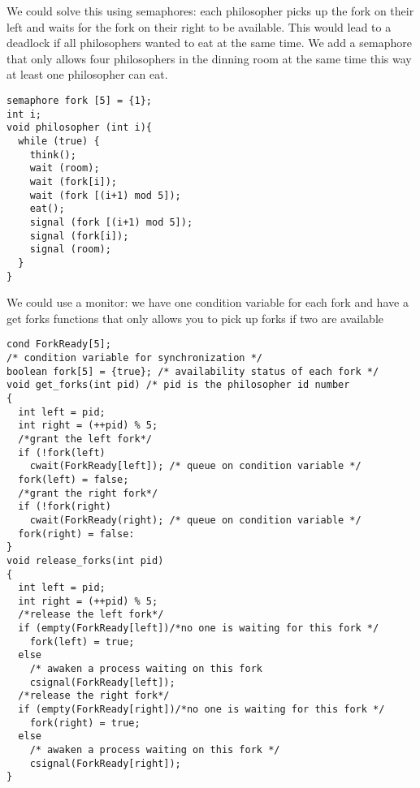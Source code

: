 \documentclass[12pt]{article}
\begin{document}
We could solve this using semaphores: each philosopher picks up the fork on their left and waits for the fork on their right to be available. This would lead to a deadlock if all philosophers wanted to eat at the same time. We add a semaphore that only allows four philosophers in the dinning room at the same time this way at least one philosopher can eat.

\begin{lstlisting}
semaphore fork [5] = {1};
int i;
void philosopher (int i){
  while (true) {
    think();
    wait (room);
    wait (fork[i]);
    wait (fork [(i+1) mod 5]);
    eat();
    signal (fork [(i+1) mod 5]);
    signal (fork[i]);
    signal (room);
  }
}
\end{lstlisting}

We could use a monitor: we have one condition variable for each fork and have a get forks functions that only allows you to pick up forks if two are available

\begin{lstlisting}
cond ForkReady[5];
/* condition variable for synchronization */
boolean fork[5] = {true}; /* availability status of each fork */
void get_forks(int pid) /* pid is the philosopher id number
{
  int left = pid;
  int right = (++pid) % 5;
  /*grant the left fork*/
  if (!fork(left)
    cwait(ForkReady[left]); /* queue on condition variable */
  fork(left) = false;
  /*grant the right fork*/
  if (!fork(right)
    cwait(ForkReady(right); /* queue on condition variable */
  fork(right) = false:
}
void release_forks(int pid)
{
  int left = pid;
  int right = (++pid) % 5;
  /*release the left fork*/
  if (empty(ForkReady[left])/*no one is waiting for this fork */
    fork(left) = true;
  else
    /* awaken a process waiting on this fork
    csignal(ForkReady[left]);
  /*release the right fork*/
  if (empty(ForkReady[right])/*no one is waiting for this fork */
    fork(right) = true;
  else
    /* awaken a process waiting on this fork */
    csignal(ForkReady[right]);
}
\end{lstlisting}
\end{document}
